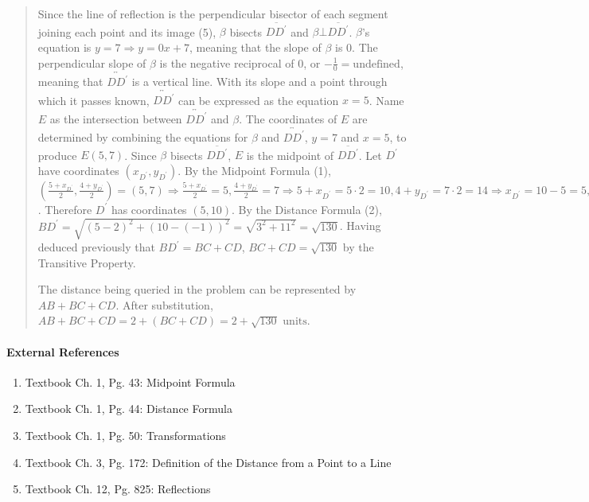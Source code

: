 \documentclass[letterpaper,12pt,twoside]{report}
\begin{document}
\begin{quotation}
		Since the line of reflection is the perpendicular bisector of each segment joining each point and its image (5), $\beta$ bisects $\overline{DD^\prime}$ and $\beta\bot\overline{DD^\prime}$. $\beta$'s equation is $y=7\Rightarrow y=0x+7$, meaning that the slope of $\beta$ is 0. The perpendicular slope of $\beta$ is the negative reciprocal of 0, or $-\frac{1}{0}=\text{undefined}$, meaning that $\overleftrightarrow{DD^\prime}$ is a vertical line. With its slope and a point through which it passes known, $\overleftrightarrow{DD^\prime}$ can be expressed as the equation $x=5$. Name $E$ as the intersection between $\overleftrightarrow{DD^\prime}$ and $\beta$. The coordinates of $E$ are determined by combining the equations for $\beta$ and $\overleftrightarrow{DD^\prime}$, $y=7$ and $x=5$, to produce $E(5,7)$. Since $\beta$ bisects $\overline{DD^\prime}$, $E$ is the midpoint of $\overline{DD^\prime}$. Let $D^\prime$ have coordinates $(x_{D^\prime}, y_{D^\prime})$. By the Midpoint Formula (1), $(\frac{5+x_{D^\prime}}{2},\frac{4+y_{D^\prime}}{2})=(5,7) \Rightarrow \frac{5+x_{D^\prime}}{2} = 5, \frac{4+y_{D^\prime}}{2}=7 \Rightarrow 5+x_{D^\prime}=5\cdot2=10, 4+y_{D^\prime}=7\cdot2=14 \Rightarrow x_{D^\prime}=10-5=5, y_{D^\prime}=14-4=10$. Therefore $D^\prime$ has coordinates $(5,10)$. By the Distance Formula (2), $BD^\prime=\sqrt{(5-2)^2+(10-(-1))^2}=\sqrt{3^2+11^2}=\sqrt{130}$. Having deduced previously that $BD^\prime=BC+CD$, $BC+CD=\sqrt{130}$ by the Transitive Property.
		
		The distance being queried in the problem can be represented by $AB+BC+CD$. After substitution, $AB+BC+CD=2+(BC+CD)=\boxed{2+\sqrt{130} \text{  units}}$.
				
	\end{quotation}
	
	\paragraph{External References}
	
	\begin{enumerate}
		\item Textbook Ch. 1, Pg. 43: Midpoint Formula
		\item Textbook Ch. 1, Pg. 44: Distance Formula
		\item Textbook Ch. 1, Pg. 50: Transformations
		\item Textbook Ch. 3, Pg. 172: Definition of the Distance from a Point to a Line
		\item Textbook Ch. 12, Pg. 825: Reflections
	\end{enumerate}
	
\end{document}

